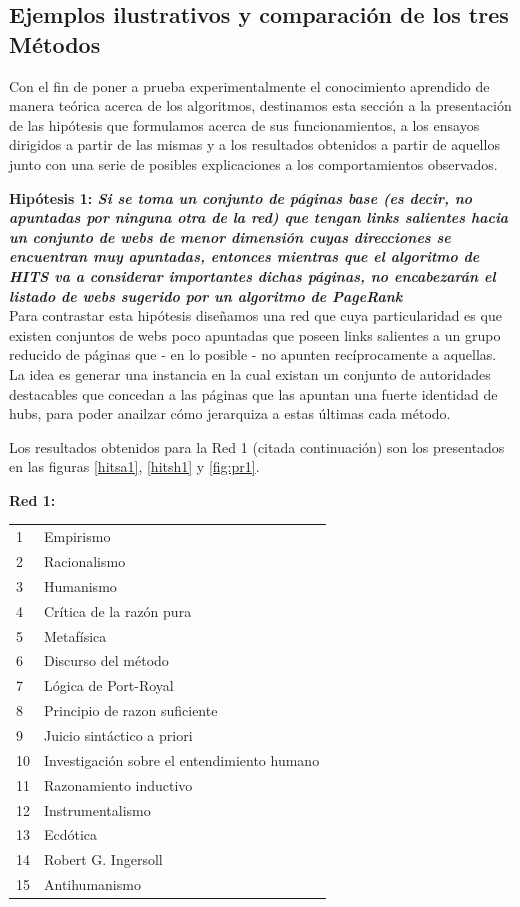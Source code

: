 \documentclass[a4paper]{article}
\begin{document}
\newpage

\subsection{Ejemplos ilustrativos y comparaci\'on de los tres M\'etodos}


Con el fin de poner a prueba experimentalmente el conocimiento aprendido de manera teórica acerca de los algoritmos, destinamos esta sección a la presentación de las hipótesis que formulamos acerca de sus funcionamientos, a los ensayos dirigidos a partir de las mismas y a los resultados obtenidos a partir de aquellos junto con una serie de posibles explicaciones a los comportamientos observados.

\textbf{Hipótesis 1: \itshape{Si se toma un conjunto de páginas base (es decir, no apuntadas por ninguna otra de la red) que tengan links salientes hacia un conjunto de webs de menor dimensión cuyas direcciones se encuentran muy apuntadas, entonces mientras que el algoritmo de HITS va a considerar importantes dichas páginas, no encabezarán el listado de webs sugerido por un algoritmo de PageRank}}\\


Para contrastar esta hipótesis diseñamos una red que cuya particularidad es que existen conjuntos de webs poco apuntadas que poseen links salientes a un grupo reducido de páginas que - en lo posible - no apunten recíprocamente a aquellas. La idea es generar una instancia en la cual existan un conjunto de autoridades destacables  que concedan a las páginas que las apuntan una fuerte identidad de hubs, para poder anailzar cómo jerarquiza a estas últimas cada método.

Los resultados obtenidos para la Red 1  (citada continuación) son los presentados en las figuras \ref{hitsa1}, \ref{hitsh1} y \ref{fig:pr1}.

\textbf{Red 1:}\\

\begin{tabular}{l l}
1 & Empirismo \\
2 & Racionalismo \\
3 & Humanismo \\
4 & Crítica de la razón pura \\
5 & Metafísica \\
6 & Discurso del método \\
7 & Lógica de Port-Royal \\
8 & Principio de razon suficiente \\
9 & Juicio sintáctico a priori \\
10 & Investigación sobre el entendimiento humano \\
11 & Razonamiento inductivo \\
12 & Instrumentalismo \\
13 & Ecdótica \\
14 & Robert G. Ingersoll \\
15 & Antihumanismo \\
\end{tabular}
\end{document}
